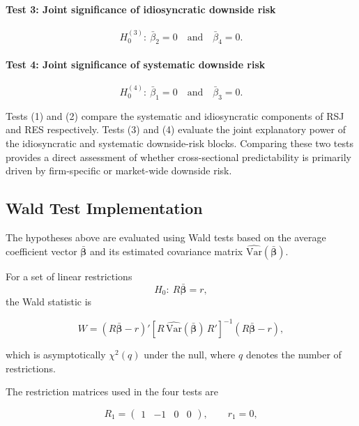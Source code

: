 \documentclass[11pt,a4paper]{article}
\begin{document}
\paragraph{Test 3: Joint significance of idiosyncratic downside risk}
\begin{equation}
H_0^{(3)}:\ \bar{\beta}_2 = 0
\quad \text{and} \quad
\bar{\beta}_4 = 0.
\label{eq:H3}
\end{equation}

\paragraph{Test 4: Joint significance of systematic downside risk}
\begin{equation}
H_0^{(4)}:\ \bar{\beta}_1 = 0
\quad \text{and} \quad
\bar{\beta}_3 = 0.
\label{eq:H4}
\end{equation}

Tests (1) and (2) compare the systematic and idiosyncratic components of
RSJ and RES respectively. Tests (3) and (4) evaluate the joint
explanatory power of the idiosyncratic and systematic downside-risk
blocks. Comparing these two tests provides a direct assessment of
whether cross-sectional predictability is primarily driven by
firm-specific or market-wide downside risk.

\subsection{Wald Test Implementation}

The hypotheses above are evaluated using Wald tests based on the average
coefficient vector $\bar{\bm{\beta}}$ and its estimated covariance matrix
$\widehat{\mathrm{Var}}(\bar{\bm{\beta}})$.

For a set of linear restrictions
\[
H_0:\ R\bar{\bm{\beta}} = r,
\]
the Wald statistic is

\begin{equation}
W
=
(R\bar{\bm{\beta}} - r)'
\left[
R\,\widehat{\mathrm{Var}}(\bar{\bm{\beta}})\,R'
\right]^{-1}
(R\bar{\bm{\beta}} - r),
\label{eq:wald}
\end{equation}

which is asymptotically $\chi^2(q)$ under the null, where $q$ denotes
the number of restrictions.

The restriction matrices used in the four tests are

\begin{equation}
R_1 =
\begin{pmatrix}
1 & -1 & 0 & 0
\end{pmatrix},
\qquad
r_1 = 0,
\label{eq:R1}
\end{equation}
\end{document}

